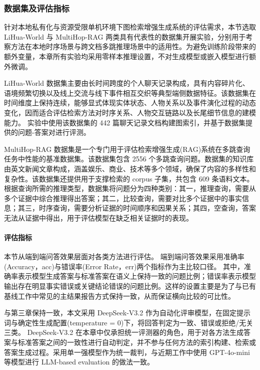 \documentclass[promaster, vlined]{DissertUESTC}
\begin{document}
\subsubsection{数据集及评估指标}
针对本地私有化与资源受限单机环境下图检索增强生成系统的评估需求，本节选取 LiHua-World 与 MultiHop-RAG 两类具有代表性的数据集开展实验，分别用于考察方法在本地时序场景与跨文档多跳推理场景中的适用性。为避免训练阶段带来的额外变量，本章所有实验均采用零样本推理设置，不对生成模型或嵌入模型进行额外微调。

LiHua-World 数据集主要由长时间跨度的个人聊天记录构成，具有内容碎片化、语境频繁切换以及线上交流与线下事件相互交织等典型端侧数据特征。该数据集在时间维度上保持连续，能够显式体现实体状态、人物关系以及事件演化过程的动态变化，因而适合评估检索方法对时序关系、人物交互链路以及长尾细节信息的建模能力。
实验中使用该数据集的 442 篇聊天记录文档构建图索引，并基于数据集提供的问题-答案对进行评测。

MultiHop-RAG 数据集是一个专门用于评估检索增强生成(RAG)系统在多跳查询任务中性能的基准数据集。该数据集包含 2556 个多跳查询问题。数据集的知识库由英文新闻文章构成，涵盖娱乐、商业、技术等多个领域，确保了内容的多样性和复杂性。该数据集还提供用于支撑检索的 corpus 子集，共包含 609 条语料文本。
根据查询所需的推理类型，数据集将问题分为四种类别：其一，推理查询，需要从多个证据中综合推理得出答案；其二，比较查询，需要对比多个证据中的事实信息；其三，时序查询，需要分析证据的时间顺序和因果关系；其四，空查询，答案无法从证据中得出，用于评估模型在缺乏相关证据时的表现。

\paragraph{评估指标}
本节从端到端问答效果层面对各类方法进行评估。
端到端问答效果采用准确率(Accuracy，acc)与错误率(Error Rate，err)两个指标作为主比较口径。
其中，准确率表示模型生成答案与标准答案在语义上保持一致的问题比例；错误率表示模型输出存在明显事实错误或关键结论错误的问题比例。这样的设置主要是为了与已有基线工作\cite{edge2024local,guo2024lightrag,fan2024minirag}中常见的主结果报告方式保持一致，从而保证横向比较的可比性。

与第三章保持一致，本文采用 DeepSeek-V3.2\cite{liu2025deepseek} 作为自动化评审模型，在固定提示词与确定性生成配置(temperature = 0)下，将回答判定为一致、错误或拒绝/无关三类。
DeepSeek-V3.2 在本章中仅承担统一评测器的角色，用于对各方法生成答案与标准答案之间的一致性进行自动判定，并不参与任何方法的索引构建、检索或答案生成过程。采用单一强模型作为统一裁判，与近期工作\cite{edge2024local,guo2024lightrag,fan2024minirag}中使用 GPT-4o-mini 等模型进行 LLM-based evaluation 的做法一致。
\end{document}
